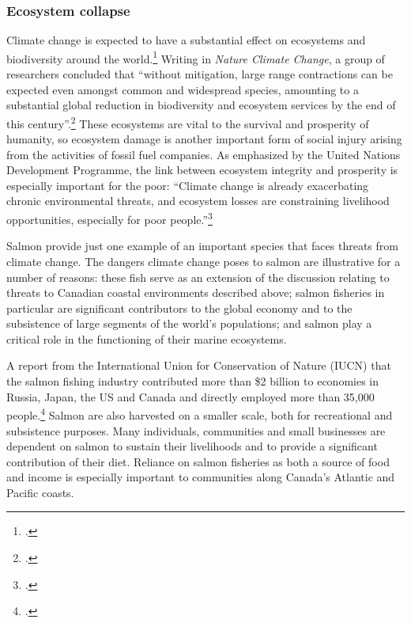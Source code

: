 	\subsubsection{Ecosystem collapse}



Climate change is expected to have a substantial effect on ecosystems and biodiversity around the world.\footcite[][p. 1]{VulnerableSpecies}
Writing in \emph{Nature Climate Change}, a group of researchers concluded that ``without mitigation, large range contractions can be expected even amongst common and widespread species, amounting to a substantial global reduction in biodiversity and ecosystem services by the end of this century''.\footcite[][p. 1]{WarrenBiodiversity}
These ecosystems are vital to the survival and prosperity of humanity, so ecosystem damage is another important form of social injury arising from the activities of fossil fuel companies.
As emphasized by the United Nations Development Programme, the link between ecosystem integrity and prosperity is especially important for the poor: ``Climate change is already exacerbating chronic environmental threats, and ecosystem losses are constraining livelihood opportunities, especially for poor people.''\footcite[][p. 95]{UNHumanDev2013}


Salmon provide just one example of an important species that faces threats from climate change. 
The dangers climate change poses to salmon are illustrative for a number of reasons: these fish serve as an extension of the discussion relating to threats to Canadian coastal environments described above; salmon fisheries in particular are significant contributors to the global economy and to the subsistence of large segments of the world’s populations; and salmon play a critical role in the functioning of their marine ecosystems.



A report from the International Union for Conservation of Nature (IUCN) that the salmon fishing industry contributed more than \$2 billion to economies in Russia, Japan, the US and Canada and directly employed more than 35,000 people.\footcite[][p. 2]{IUCNSalmon}
Salmon are also harvested on a smaller scale, both for recreational and subsistence purposes.
Many individuals, communities and small businesses are dependent on salmon to sustain their livelihoods and to provide a significant contribution of their diet. 
Reliance on salmon fisheries as both a source of food and income is especially important to communities along Canada's Atlantic and Pacific coasts. 


